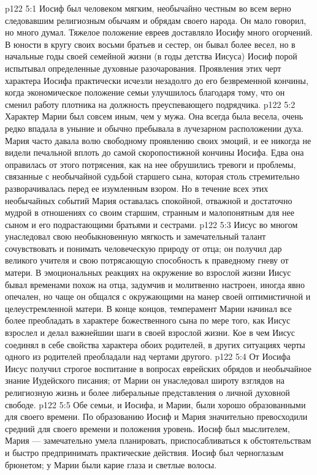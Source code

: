 \vs p122 5:1 Иосиф был человеком мягким, необычайно честным во всем верно следовавшим религиозным обычаям и обрядам своего народа. Он мало говорил, но много думал. Тяжелое положение евреев доставляло Иосифу много огорчений. В юности в кругу своих восьми братьев и сестер, он бывал более весел, но в начальные годы своей семейной жизни (в годы детства Иисуса) Иосиф порой испытывал определенные духовные разочарования. Проявления этих черт характера Иосифа практически исчезли незадолго до его безвременной кончины, когда экономическое положение семьи улучшилось благодаря тому, что он сменил работу плотника на должность преуспевающего подрядчика.
\vs p122 5:2 Характер Марии был совсем иным, чем у мужа. Она всегда была весела, очень редко впадала в уныние и обычно пребывала в лучезарном расположении духа. Мария часто давала волю свободному проявлению своих эмоций, и ее никогда не видели печальной вплоть до самой скоропостижной кончины Иосифа. Едва она оправилась от этого потрясения, как на нее обрушились тревоги и проблемы, связанные с необычайной судьбой старшего сына, которая столь стремительно разворачивалась перед ее изумленным взором. Но в течение всех этих необычайных событий Мария оставалась спокойной, отважной и достаточно мудрой в отношениях со своим старшим, странным и малопонятным для нее сыном и его подрастающими братьями и сестрами.
\vs p122 5:3 Иисус во многом унаследовал свою необыкновенную мягкость и замечательный талант сочувствовать и понимать человеческую природу от отца; он получил дар великого учителя и свою потрясающую способность к праведному гневу от матери. В эмоциональных реакциях на окружение во взрослой жизни Иисус бывал временами похож на отца, задумчив и молитвенно настроен, иногда явно опечален, но чаще он общался с окружающими на манер своей оптимистичной и целеустремленной матери. В конце концов, темперамент Марии начинал все более преобладать в характере божественного сына по мере того, как Иисус взрослел и делал важнейшии шаги в своей взрослой жизни. Кое в чем Иисус соединял в себе свойства характера обоих родителей, в других ситуациях черты одного из родителей преобладали над чертами другого.
\vs p122 5:4 От Иосифа Иисус получил строгое воспитание в вопросах еврейских обрядов и необычайное знание Иудейского писания; от Марии он унаследовал широту взглядов на религиозную жизнь и более либеральные представления о личной духовной свободе.
\vs p122 5:5 Обе семьи, и Иосифа, и Марии, были хорошо образованными для своего времени. По образованию Иосиф и Мария значительно превосходили средний для своего времени и положения уровень. Иосиф был мыслителем, Мария --- замечательно умела планировать, приспосабливаться к обстоятельствам и быстро предпринимать практические действия. Иосиф был черноглазым брюнетом; у Марии были карие глаза и светлые волосы.
